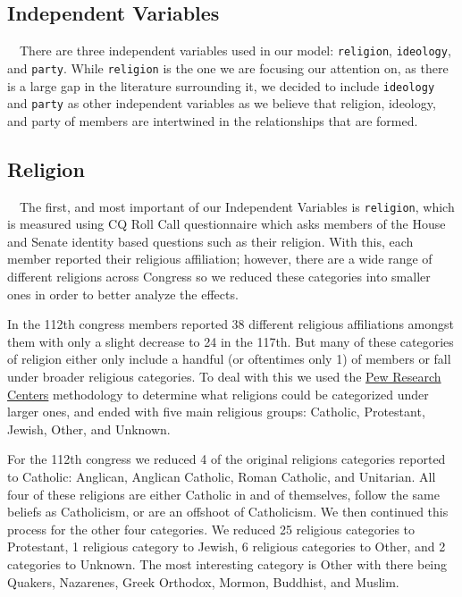\documentclass[Royal,times,sageh]{sagej}
\begin{document}
\hypertarget{independent-variables}{%
\subsection{Independent Variables}\label{independent-variables}}

\doublespacing

~~There are three independent variables used in our model:
\texttt{religion}, \texttt{ideology}, and \texttt{party}. While
\texttt{religion} is the one we are focusing our attention on, as there
is a large gap in the literature surrounding it, we decided to include
\texttt{ideology} and \texttt{party} as other independent variables as
we believe that religion, ideology, and party of members are intertwined
in the relationships that are formed.

\hypertarget{religion}{%
\subsection{Religion}\label{religion}}

\doublespacing

~~The first, and most important of our Independent Variables is
\texttt{religion}, which is measured using CQ Roll Call questionnaire
which asks members of the House and Senate identity based questions such
as their religion. With this, each member reported their religious
affiliation; however, there are a wide range of different religions
across Congress so we reduced these categories into smaller ones in
order to better analyze the effects.

In the 112th congress members reported 38 different religious
affiliations amongst them with only a slight decrease to 24 in the
117th. But many of these categories of religion either only include a
handful (or oftentimes only 1) of members or fall under broader
religious categories. To deal with this we used the
\href{https://www.pewresearch.org/religion/2021/01/04/faith-on-the-hill-2021/}{Pew
Research Centers} methodology to determine what religions could be
categorized under larger ones, and ended with five main religious
groups: Catholic, Protestant, Jewish, Other, and Unknown.

For the 112th congress we reduced 4 of the original religions categories
reported to Catholic: Anglican, Anglican Catholic, Roman Catholic, and
Unitarian. All four of these religions are either Catholic in and of
themselves, follow the same beliefs as Catholicism, or are an offshoot
of Catholicism. We then continued this process for the other four
categories. We reduced 25 religious categories to Protestant, 1
religious category to Jewish, 6 religious categories to Other, and 2
categories to Unknown. The most interesting category is Other with there
being Quakers, Nazarenes, Greek Orthodox, Mormon, Buddhist, and Muslim.
\end{document}
